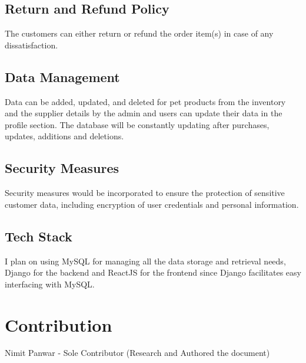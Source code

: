 \documentclass{article}
\begin{document}
\subsection{Return and Refund Policy}

The customers can either return or refund the order item(s) in case of any dissatisfaction.

\subsection{Data Management}

Data can be added, updated, and deleted for pet products from the inventory and the supplier details by the admin and users can update their data in the profile section. The database will be constantly updating after purchases, updates, additions and deletions.

\subsection{Security Measures}

Security measures would be incorporated to ensure the protection of sensitive customer data, including encryption of user credentials and personal information. 

\subsection{Tech Stack}

I plan on using MySQL for managing all the data storage and retrieval needs, Django for the backend and ReactJS for the frontend since Django facilitates easy interfacing with MySQL.

\section{Contribution}
Nimit Panwar - Sole Contributor (Research and Authored the document)
\end{document}
